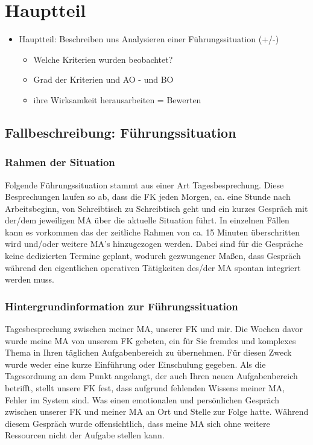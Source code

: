 \chapter{Hauptteil}
\label{chap:hauptteil}

\begin{itemize}
\item Hauptteil: Beschreiben uns Analysieren einer Führungssituation (+/-)
\begin{itemize}
\item Welche Kriterien wurden beobachtet?
\item Grad der Kriterien und \ac{AO} - und \ac{BO}
\item ihre Wirksamkeit herausarbeiten = Bewerten
\end{itemize}
\end{itemize}



\section{Fallbeschreibung: Führungssituation}
\subsection*{Rahmen der Situation}
Folgende Führungssituation stammt aus einer Art Tagesbesprechung.
Diese Besprechungen laufen so ab, dass die \ac{FK} jeden Morgen, ca. eine Stunde nach Arbeitsbeginn, von Schreibtisch zu Schreibtisch geht und ein kurzes Gespräch   mit der/dem jeweiligen \ac{MA} über die aktuelle Situation führt. 
In einzelnen Fällen kann es vorkommen das der zeitliche Rahmen von ca. 15 Minuten überschritten wird und/oder weitere \ac{MA}'s hinzugezogen werden.
Dabei sind für die Gespräche keine dedizierten Termine geplant, wodurch gezwungener Maßen, dass Gespräch während den eigentlichen operativen Tätigkeiten des/der \ac{MA} spontan integriert werden muss.  

\subsection*{Hintergrundinformation zur Führungssituation}
Tagesbesprechung zwischen meiner \ac{MA}, unserer \ac{FK} und mir. 
Die Wochen davor wurde meine \ac{MA} von unserem \ac{FK} gebeten, ein für Sie fremdes und komplexes Thema in Ihren täglichen Aufgabenbereich zu übernehmen. 
Für diesen Zweck wurde weder eine kurze Einführung oder Einschulung gegeben.
Als die Tagesordnung an dem Punkt angelangt, der auch Ihren neuen Aufgabenbereich betrifft, stellt unsere \ac{FK} fest, dass aufgrund fehlenden Wissens meiner \ac{MA}, Fehler im System sind. 
Was einen emotionalen und persönlichen Gespräch zwischen unserer \ac{FK} und meiner \ac{MA} an Ort und Stelle zur Folge hatte. 
Während diesem Gespräch wurde offensichtlich, dass meine \ac{MA} sich ohne weitere Ressourcen nicht der Aufgabe stellen kann.

